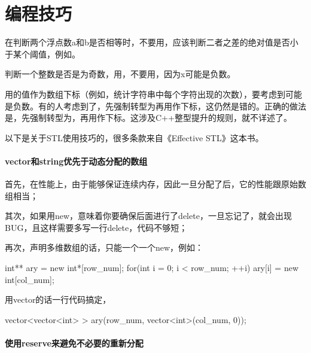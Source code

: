 \chapter{编程技巧}

在判断两个浮点数a和b是否相等时，不要用，应该判断二者之差的绝对值是否小于某个阈值，例如。

判断一个整数是否是为奇数，用，不要用，因为x可能是负数。

用的值作为数组下标（例如，统计字符串中每个字符出现的次数），要考虑到可能是负数。有的人考虑到了，先强制转型为再用作下标，这仍然是错的。正确的做法是，先强制转型为，再用作下标。这涉及C++整型提升的规则，就不详述了。

以下是关于STL使用技巧的，很多条款来自《Effective STL》这本书。

\subsubsection{vector和string优先于动态分配的数组}

首先，在性能上，由于能够保证连续内存，因此一旦分配了后，它的性能跟原始数组相当；

其次，如果用new，意味着你要确保后面进行了delete，一旦忘记了，就会出现BUG，且这样需要多写一行delete，代码不够短；

再次，声明多维数组的话，只能一个一个new，例如：
\begin{Code}
int** ary = new int*[row_num];
for(int i = 0; i < row_num; ++i)
    ary[i] = new int[col_num];
\end{Code}
用vector的话一行代码搞定，
\begin{Code}
vector<vector<int> > ary(row_num, vector<int>(col_num, 0));
\end{Code}

\subsubsection{使用reserve来避免不必要的重新分配}
